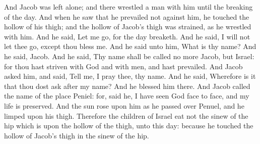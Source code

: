 And Jacob was left alone; and there wrestled a man with him until the breaking of the day. And when he saw that he prevailed not against him, he touched the hollow of his thigh; and the hollow of Jacob’s thigh was strained, as he wrestled with him. And he said, Let me go, for the day breaketh. And he said, I will not let thee go, except thou bless me. And he said unto him, What is thy name? And he said, Jacob. And he said, Thy name shall be called no more Jacob, but Israel: for thou hast striven with God and with men, and hast prevailed. And Jacob asked him, and said, Tell me, I pray thee, thy name. And he said, Wherefore is it that thou dost ask after my name? And he blessed him there. And Jacob called the name of the place Peniel: for, said he, I have seen God face to face, and my life is preserved. And the sun rose upon him as he passed over Penuel, and he limped upon his thigh. Therefore the children of Israel eat not the sinew of the hip which is upon the hollow of the thigh, unto this day: because he touched the hollow of Jacob’s thigh in the sinew of the hip. 

